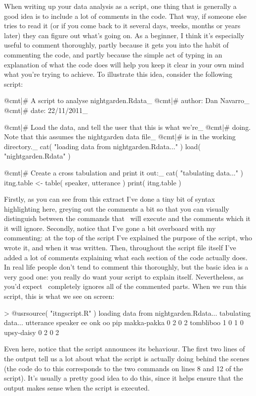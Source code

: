 
When writing up your data analysis as a script, one thing that is generally a good idea is to include a lot of comments in the code. That way, if someone else tries to read it (or if you come back to it several days, weeks, months or years later) they can figure out what's going on. As a beginner, I think it's especially useful to comment thoroughly, partly because it gets you into the habit of commenting the code, and partly because the simple act of typing in an explanation of what the code does will help you keep it clear in your own mind what you're trying to achieve. To illustrate this idea, consider the following script:

\begin{script}
@cmt|# A script to analyse nightgarden.Rdata_
@cmt|#  author: Dan Navarro_
@cmt|#  date: 22/11/2011_

@cmt|# Load the data, and tell the user that this is what we're_
@cmt|# doing. Note that this assumes the nightgarden data file_ 
@cmt|# is in the working directory._
cat( "loading data from nightgarden.Rdata...\n" )
load( "nightgarden.Rdata" )

@cmt|# Create a cross tabulation and print it out:_
cat( "tabulating data...\n" )
itng.table <- table( speaker, utterance )
print( itng.table )
\end{script}
Firstly, as you can see from this extract I've done a tiny bit of syntax highlighting here, greying out the comments a bit so that you can visually distinguish between the commands that \R\ will execute and the comments which it it will ignore. Secondly, notice that I've gone a bit overboard with my commenting: at the top of the script I've explained the purpose of the script, who wrote it, and when it was written. Then, throughout the script file itself I've added a lot of comments explaining what each section of the code actually does. In real life people don't tend to comment this thoroughly, but the basic idea is a very good one: you really do want your script to explain itself.  Nevertheless, as you'd expect \R\ completely ignores all of the commented parts. When we run this script, this is what we see on screen:
\begin{rblock1}
> @usr{source( "itngscript.R" )}
loading data from nightgarden.Rdata...
tabulating data...
             utterance
speaker       ee onk oo pip
  makka-pakka  0   2  0   2
  tombliboo    1   0  1   0
  upsy-daisy   0   2  0   2
\end{rblock1}
Even here, notice that the script announces its behaviour. The first two lines of the output tell us a lot about what the script is actually doing behind the scenes (the code do to this corresponds to the two  commands on lines 8 and 12 of the script). It's usually a pretty good idea to do this, since it helps ensure that the output makes sense when the script is executed. 

